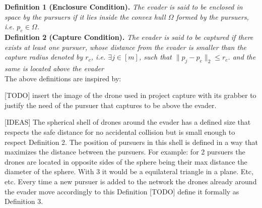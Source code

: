 \documentclass[12pt]{article}
\begin{document}
\newpage

\tableofcontents %

\newpage

\listoffigures

\newpage

\textbf{Definition 1 (Enclosure Condition).} \textit{The evader is said to be enclosed in space by the pursuers if it lies inside the convex hull $\Omega$ formed by the pursuers, i.e. $p_e \in \Omega$.}\\

\textbf{Definition 2 (Capture Condition).} \textit{The evader is said to be captured if there exists at least one pursuer, whose distance from the evader is smaller than the capture radius denoted by $r_c$, i.e. $\exists j \in [m]$, such that $\| p_j - p_e \|_2 \leq r_c$. and the same is located above the evader}\\

The above definitions are inspired by: \cite{3D-Cooperative-Pursuit-with-Guaranteed-Enclosure-via-Robust-Model-Predictive-Control}

[TODO] insert the image of the drone used in project capture with its grabber to justify the need of the pursuer that captures to be above the evader. 

[IDEAS]
 The spherical shell of drones around the evader has a defined size that respects the safe distance for no accidental collision but is small enough to respect Definition 2. The position of pursuers in this shell is defined in a way that maximizes the distance between the pursuers. For example: for 2 pursuers the drones are located in opposite sides of the sphere being their max distance the diameter of the sphere. With 3 it would be a equilateral triangle in a plane. Etc, etc. Every time a new pursuer is added to the network the drones already around the evader move accordingly to this Definition [TODO] define it formally as Definition 3.

\newpage

\end{document}
